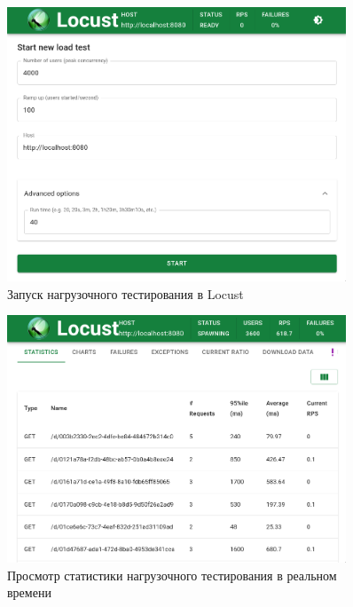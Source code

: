 \begin{figure}[H]
	\centering
	\includegraphics[width=0.9\textwidth]{img/locust-scr-1.png}
	\caption{Запуск нагрузочного тестирования в Locust}
	\label{locust:1}
\end{figure}

\begin{figure}[H]
	\centering
	\includegraphics[width=0.9\textwidth]{img/locust-scr-2.png}
	\caption{Просмотр статистики нагрузочного тестирования в реальном времени}
	\label{locust:2}
\end{figure}

